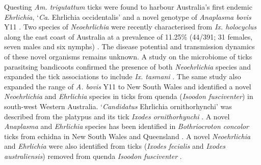 \documentclass[a4paper, nobind]{templates/ociamthesis}
\begin{document}
Questing \emph{Am. trigutattum} ticks were found to harbour Australia's first endemic \emph{Ehrlichia}, `\emph{Ca}. Ehrlichia occidentalis' and a novel genotype of \emph{Anaplasma bovis} Y11 \autocite{goftonDetectionPhylogeneticCharacterisation2017}.
Two species of \emph{Neoehrlichia} were recently characterised from \emph{Ix. holocyclus} along the east coast of Australia at a prevalence of 11.25\% (44/391; 31 females, seven males and six nymphs) \autocite{goftonPhylogeneticCharacterisationTwo2016}.
The disease potential and transmission dynamics of these novel organisms remains unknown.
A study on the microbiome of ticks parasitsing bandicoots confirmed the presence of both \emph{Neoehrlichia} species and expanded the tick associations to include \emph{Ix. tasmani} \autocite{eganBacterialCommunityProfiling2020}.
The same study also expanded the range of \emph{A. bovis} Y11 to New South Wales and identified a novel \emph{Neoehrlichia} and \emph{Ehrlichia} species in ticks from quenda (\emph{Isoodon fusciventer}) in south-west Western Australia.
`\emph{Candidatus} Ehrlichia ornithorhynchi' was described from the platypus and its tick \emph{Ixodes ornithorhynchi} \autocite{goftonNovelEhrlichiaSpecies2018}.
A novel \emph{Anaplasma} and \emph{Ehrlichia} species has been identified in \emph{Bothriocroton concolor} ticks from echidna in New South Wales and Queensland \autocite{lohIdentificationCharacterisationMicroorganisms2018,eganBacterialCommunityProfiling2020}.
A novel \emph{Neoehrlichia} and \emph{Ehrlichia} were also identified from ticks (\emph{Ixodes fecialis} and \emph{Ixodes australiensis}) removed from quenda \emph{Isoodon fusciventer} \autocite{eganBacterialCommunityProfiling2020}.
\end{document}
